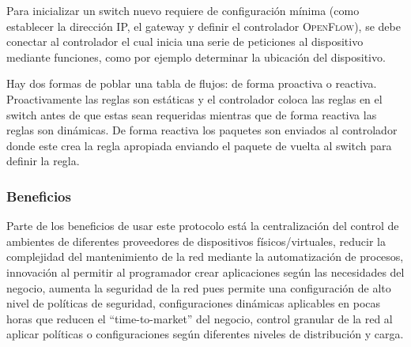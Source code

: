 \documentclass[10pt,journal,compsoc]{IEEEtran}
\begin{document}
Para inicializar un switch nuevo requiere de configuración mínima (como establecer la dirección IP, el gateway y definir el controlador \textsc{OpenFlow}), se debe conectar al controlador el cual inicia una serie de peticiones al dispositivo mediante funciones, como por ejemplo determinar la ubicación del dispositivo.

Hay dos formas de poblar una tabla de flujos: de forma proactiva o reactiva. Proactivamente las reglas son estáticas y el controlador coloca las reglas en el switch antes de que estas sean requeridas mientras que de forma reactiva las reglas son dinámicas. De forma reactiva los paquetes son enviados al controlador donde este crea la regla apropiada enviando el paquete de vuelta al switch para definir la regla. 

\subsubsection{Beneficios}
Parte de los beneficios de usar este protocolo está la centralización del control de ambientes de diferentes proveedores de dispositivos físicos/virtuales, reducir la complejidad del mantenimiento de la red mediante la automatización de procesos, innovación al permitir al programador crear aplicaciones según las necesidades del negocio, aumenta la seguridad de la red pues permite una configuración de alto nivel de políticas de seguridad, configuraciones dinámicas aplicables en pocas horas que reducen el “time-to-market” del negocio, control granular de la red al aplicar políticas o configuraciones según diferentes niveles de distribución y carga.
\end{document}

